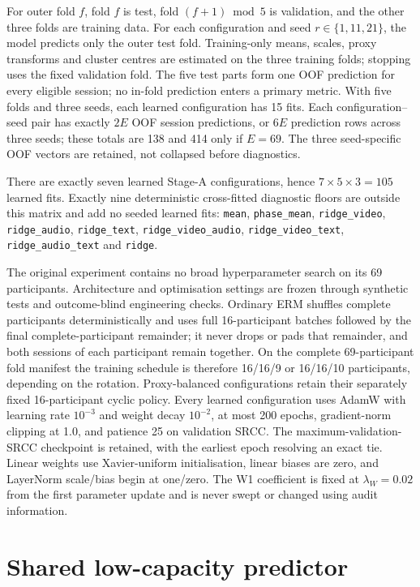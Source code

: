 For outer fold $f$, fold $f$ is test, fold $(f+1)\bmod 5$ is validation, and the other three folds
are training data. For each configuration and seed $r\in\{1,11,21\}$, the model predicts only the
outer test fold. Training-only means, scales, proxy transforms and cluster centres are estimated
on the three training folds; stopping uses the fixed validation fold. The five test parts form one
OOF prediction for
every eligible session; no in-fold prediction enters a primary metric. With five folds and three
seeds, each learned configuration has 15 fits. Each configuration--seed pair has exactly $2E$
OOF session predictions, or $6E$ prediction rows across three seeds; these totals are 138 and 414
only if $E=69$. The three seed-specific OOF vectors are retained, not collapsed before
diagnostics.

There are exactly seven learned Stage-A configurations, hence $7\times5\times3=105$ learned
fits. Exactly nine deterministic cross-fitted diagnostic floors are outside this matrix and add no
seeded learned fits: \texttt{mean}, \texttt{phase\_mean}, \texttt{ridge\_video},
\texttt{ridge\_audio}, \texttt{ridge\_text}, \texttt{ridge\_video\_audio},
\texttt{ridge\_video\_text}, \texttt{ridge\_audio\_text} and \texttt{ridge}.

The original experiment contains no broad hyperparameter search on its 69 participants.
Architecture and optimisation settings are frozen through synthetic tests and outcome-blind
engineering checks. Ordinary ERM shuffles complete participants deterministically and uses full
16-participant batches followed by the final complete-participant remainder; it never drops or
pads that remainder, and both sessions of each participant remain together. On the complete
69-participant fold manifest the training schedule is therefore 16/16/9 or 16/16/10 participants,
depending on the rotation. Proxy-balanced configurations retain their separately fixed
16-participant cyclic policy. Every learned configuration uses AdamW with learning rate
$10^{-3}$ and weight decay $10^{-2}$, at most 200
epochs, gradient-norm clipping at 1.0, and patience 25 on validation SRCC. The maximum-validation-
SRCC checkpoint is retained, with the earliest epoch resolving an exact tie. Linear weights use
Xavier-uniform initialisation, linear biases are zero, and LayerNorm scale/bias begin at one/zero.
The W1 coefficient is fixed at $\lambda_W=0.02$ from the first parameter update and is never
swept or changed using audit information.

\section{Shared low-capacity predictor}

